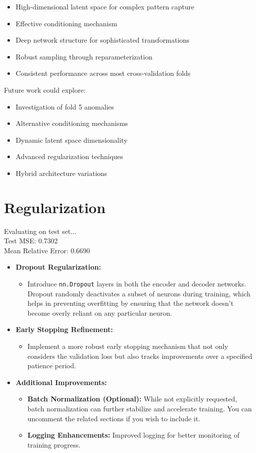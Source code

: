 \documentclass{article}
\begin{document}
\begin{itemize}
    \item High-dimensional latent space for complex pattern capture
    \item Effective conditioning mechanism
    \item Deep network structure for sophisticated transformations
    \item Robust sampling through reparameterization
    \item Consistent performance across most cross-validation folds
\end{itemize}

Future work could explore:
\begin{itemize}
    \item Investigation of fold 5 anomalies
    \item Alternative conditioning mechanisms
    \item Dynamic latent space dimensionality
    \item Advanced regularization techniques
    \item Hybrid architecture variations
\end{itemize}

\section{Regularization}

Evaluating on test set...\\
Test MSE: 0.7302\\
Mean Relative Error: 0.6690

\begin{itemize}[leftmargin=*]
\item \textbf{Dropout Regularization:}
  \begin{itemize}
    \item Introduce \texttt{nn.Dropout} layers in both the encoder and decoder networks. Dropout randomly deactivates a subset of neurons during training, which helps in preventing overfitting by ensuring that the network doesn't become overly reliant on any particular neuron.
  \end{itemize}

\item \textbf{Early Stopping Refinement:}
  \begin{itemize}
    \item Implement a more robust early stopping mechanism that not only considers the validation loss but also tracks improvements over a specified patience period.
  \end{itemize}

\item \textbf{Additional Improvements:}
  \begin{itemize}
    \item \textbf{Batch Normalization (Optional):} While not explicitly requested, batch normalization can further stabilize and accelerate training. You can uncomment the related sections if you wish to include it.
    \item \textbf{Logging Enhancements:} Improved logging for better monitoring of training progress.
  \end{itemize}
\end{itemize}
\end{document}
